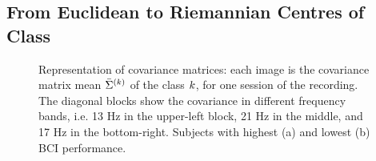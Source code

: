 \subsection{From Euclidean to Riemannian Centres of Class}
\label{subsec: from-euclid-to-riemann}

\begin{figure}[h!]
\centering
{}
\caption{Representation of covariance matrices: each image is the covariance matrix mean $\bar{\Sigma}^{(k)}$ of the class $k$, for one session of the recording. The diagonal blocks show the covariance in different frequency bands, i.e. 13 Hz in the upper-left block, 21 Hz in the middle, and 17 Hz in the bottom-right. Subjects with highest (a) and lowest (b) BCI performance. 
}
\label{fig:covmat}
\end{figure}

